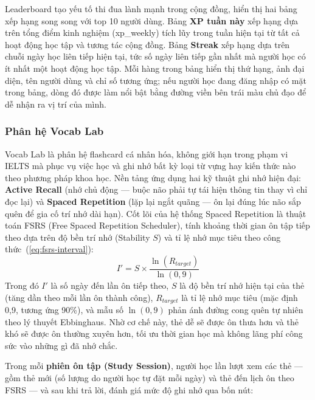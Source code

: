 Leaderboard tạo yếu tố thi đua lành mạnh trong cộng đồng, hiển thị hai bảng xếp hạng song song với top 10 người dùng. Bảng \textbf{XP tuần này} xếp hạng dựa trên tổng điểm kinh nghiệm (xp\_weekly) tích lũy trong tuần hiện tại từ tất cả hoạt động học tập và tương tác cộng đồng. Bảng \textbf{Streak} xếp hạng dựa trên chuỗi ngày học liên tiếp hiện tại, tức số ngày liên tiếp gần nhất mà người học có ít nhất một hoạt động học tập. Mỗi hàng trong bảng hiển thị thứ hạng, ảnh đại diện, tên người dùng và chỉ số tương ứng; nếu người học đang đăng nhập có mặt trong bảng, dòng đó được làm nổi bật bằng đường viền bên trái màu chủ đạo để dễ nhận ra vị trí của mình.

\subsubsection{Phân hệ Vocab Lab}

Vocab Lab là phân hệ flashcard cá nhân hóa, không giới hạn trong phạm vi IELTS mà phục vụ việc học và ghi nhớ bất kỳ loại từ vựng hay kiến thức nào theo phương pháp khoa học. Nền tảng ứng dụng hai kỹ thuật ghi nhớ hiện đại: \textbf{Active Recall} (nhớ chủ động --- buộc não phải tự tái hiện thông tin thay vì chỉ đọc lại) và \textbf{Spaced Repetition} (lặp lại ngắt quãng --- ôn lại đúng lúc não sắp quên để gia cố trí nhớ dài hạn). Cốt lõi của hệ thống Spaced Repetition là thuật toán FSRS (Free Spaced Repetition Scheduler), tính khoảng thời gian ôn tập tiếp theo dựa trên độ bền trí nhớ (Stability $S$) và tỉ lệ nhớ mục tiêu theo công thức~(\ref{eq:fsrs-interval}):
\begin{equation}
    I' = S \times \dfrac{\ln(R_{target})}{\ln(0{,}9)}
    \label{eq:fsrs-interval}
\end{equation}
Trong đó $I'$ là số ngày đến lần ôn tiếp theo, $S$ là độ bền trí nhớ hiện tại của thẻ (tăng dần theo mỗi lần ôn thành công), $R_{target}$ là tỉ lệ nhớ mục tiêu (mặc định 0{,}9, tương ứng 90\%), và mẫu số $\ln(0{,}9)$ phản ánh đường cong quên tự nhiên theo lý thuyết Ebbinghaus. Nhờ cơ chế này, thẻ dễ sẽ được ôn thưa hơn và thẻ khó sẽ được ôn thường xuyên hơn, tối ưu thời gian học mà không lãng phí công sức vào những gì đã nhớ chắc.

Trong mỗi \textbf{phiên ôn tập (Study Session)}, người học lần lượt xem các thẻ --- gồm thẻ mới (số lượng do người học tự đặt mỗi ngày) và thẻ đến lịch ôn theo FSRS --- và sau khi trả lời, đánh giá mức độ ghi nhớ qua bốn nút:

